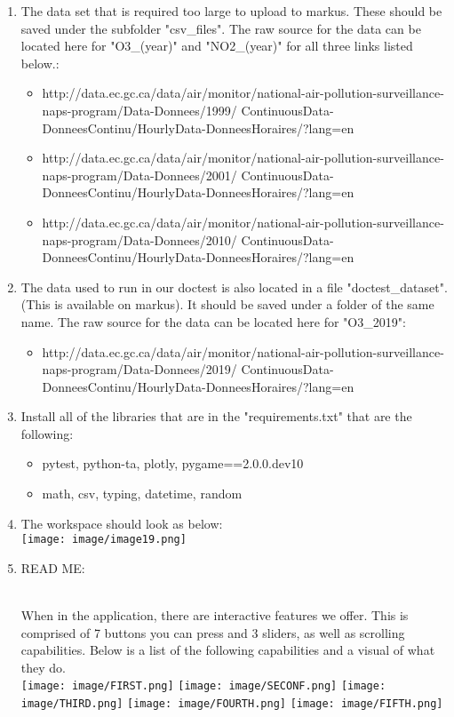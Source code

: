 \documentclass[fontsize=11pt]{article}
\begin{document}
\begin{enumerate}
  \item The data set that is required too large to upload to markus. These should be saved under the subfolder "csv\_files". The raw source for the data can be located here for "O3\_(year)" and "NO2\_(year)" for all three links listed below.:
  \begin{itemize}
      \item http://data.ec.gc.ca/data/air/monitor/national-air-pollution-surveillance-naps-program/Data-Donnees/1999/
      ContinuousData-DonneesContinu/HourlyData-DonneesHoraires/?lang=en
      \item http://data.ec.gc.ca/data/air/monitor/national-air-pollution-surveillance-naps-program/Data-Donnees/2001/
      ContinuousData-DonneesContinu/HourlyData-DonneesHoraires/?lang=en
      \item http://data.ec.gc.ca/data/air/monitor/national-air-pollution-surveillance-naps-program/Data-Donnees/2010/
      ContinuousData-DonneesContinu/HourlyData-DonneesHoraires/?lang=en
  \end{itemize}
  \item The data used to run in our doctest is also located in a file "doctest\_dataset". (This is available on markus). It should be saved under a folder of the same name. The raw source for the data can be located here for "O3\_2019":
  \begin{itemize}
      \item http://data.ec.gc.ca/data/air/monitor/national-air-pollution-surveillance-naps-program/Data-Donnees/2019/
      ContinuousData-DonneesContinu/HourlyData-DonneesHoraires/?lang=en
  \end{itemize}
  \item Install all of the libraries that are in the "requirements.txt" that are the following:
  \begin{itemize}
      \item pytest, python-ta, plotly, pygame==2.0.0.dev10
      \item math, csv, typing, datetime, random
  \end{itemize}
  \item The workspace should look as below:\\
  \texttt{[image: image/image19.png]}
  
\newpage

\item READ ME:

\\When in the application, there are interactive features we offer. This is comprised of 7 buttons you can press and 3 sliders, as well as scrolling capabilities. Below is a list of the following capabilities and a visual of what they do.\\

\texttt{[image: image/FIRST.png]}
\newpage
\texttt{[image: image/SECONF.png]}
\texttt{[image: image/THIRD.png]}
\texttt{[image: image/FOURTH.png]}
\texttt{[image: image/FIFTH.png]}
\end{enumerate}
\end{document}
